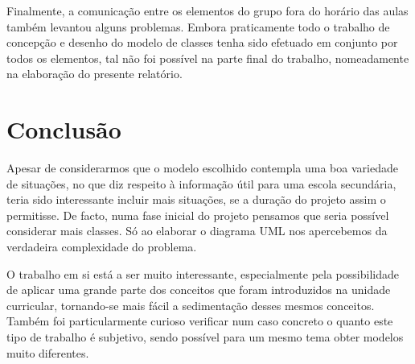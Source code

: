 \documentclass[12pt,a4paper,reqno]{report}
\numberwithin{figure}{section}
\numberwithin{equation}{section}
\begin{document}
Finalmente, a comunicação entre os elementos do grupo fora do horário das aulas também levantou alguns problemas. Embora praticamente todo o trabalho de concepção e desenho do modelo de classes tenha sido efetuado em conjunto por todos os elementos, tal não foi possível na parte final do trabalho, nomeadamente na elaboração do presente relatório.

\chapter{Conclusão}

Apesar de considerarmos que o modelo escolhido contempla uma boa variedade de situações, no que diz respeito à informação útil para uma escola secundária, teria sido interessante incluir mais situações, se a duração do projeto assim o permitisse. De facto, numa fase inicial do projeto pensamos que seria possível considerar mais classes. Só ao elaborar o diagrama UML nos apercebemos da verdadeira complexidade do problema.

O trabalho em si está a ser muito interessante, especialmente pela possibilidade de aplicar uma grande parte dos conceitos que foram introduzidos na unidade curricular, tornando-se mais fácil a sedimentação desses mesmos conceitos. Também foi particularmente curioso verificar num caso concreto o quanto este tipo de trabalho é subjetivo, sendo possível para um mesmo tema obter modelos muito diferentes.
\end{document}
